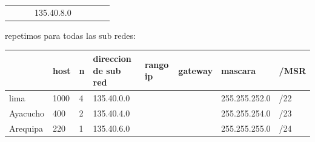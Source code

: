 \begin{table}[htbp]
\begin{tabular}{@{}llllllll@{}}
                                                              &                                                            &                                                         & 135.40.8.0                                                                 &                                                                &                                                               &                                                               &                                                           
\end{tabular}
\end{table}

repetimos para todas las sub redes:

\begin{table}[htbp]
\begin{tabular}{@{}llllllll@{}}
\toprule
\rowcolor[HTML]{32CB00} 
\multicolumn{1}{|l|}{\cellcolor[HTML]{32CB00}\textbf{subred}} & \multicolumn{1}{l|}{\cellcolor[HTML]{32CB00}\textbf{host}} & \multicolumn{1}{l|}{\cellcolor[HTML]{32CB00}\textbf{n}} & \multicolumn{1}{l|}{\cellcolor[HTML]{32CB00}\textbf{direccion de sub red}} & \multicolumn{1}{l|}{\cellcolor[HTML]{32CB00}\textbf{rango ip}} & \multicolumn{1}{l|}{\cellcolor[HTML]{32CB00}\textbf{gateway}} & \multicolumn{1}{l|}{\cellcolor[HTML]{32CB00}\textbf{mascara}} & \multicolumn{1}{l|}{\cellcolor[HTML]{32CB00}\textbf{/MSR}} \\ \midrule
\multicolumn{1}{|l|}{lima}                                    & \multicolumn{1}{l|}{1000}                                  & \multicolumn{1}{l|}{4}                                  & \multicolumn{1}{l|}{135.40.0.0}                                            & \multicolumn{1}{l|}{}                                          & \multicolumn{1}{l|}{}                                         & \multicolumn{1}{l|}{255.255.252.0}                            & \multicolumn{1}{l|}{/22}                                   \\ \midrule
\multicolumn{1}{|l|}{Ayacucho}                                & \multicolumn{1}{l|}{400}                                   & \multicolumn{1}{l|}{2}                                  & \multicolumn{1}{l|}{135.40.4.0}                                            & \multicolumn{1}{l|}{}                                          & \multicolumn{1}{l|}{}                                         & \multicolumn{1}{l|}{255.255.254.0}                            & \multicolumn{1}{l|}{/23}                                   \\ \midrule
\multicolumn{1}{|l|}{Arequipa}                                & \multicolumn{1}{l|}{220}                                   & \multicolumn{1}{l|}{1}                                  & \multicolumn{1}{l|}{135.40.6.0}                                            & \multicolumn{1}{l|}{}                                          & \multicolumn{1}{l|}{}                                         & \multicolumn{1}{l|}{255.255.255.0}                            & \multicolumn{1}{l|}{/24}                                   \\ \midrule

\end{tabular}
\end{table}
